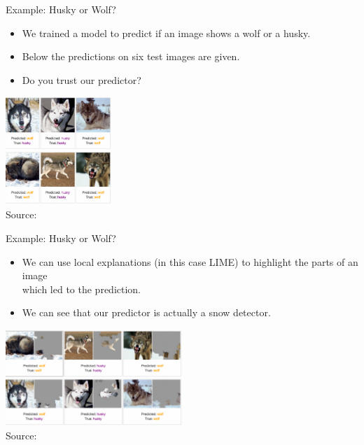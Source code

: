 \documentclass[aspectratio=169]{../latex_main/tntbeamer}  %
\begin{document}
\begin{frame}{Example: Husky or Wolf?}
	\begin{itemize}
		\item We trained a model to predict if an image shows a wolf or a husky. 
		\item Below the predictions on six test images are given. 
		\item Do you trust our predictor? 
	\end{itemize}
	\begin{center}
		\includegraphics[width=0.3\textwidth]{figure/lime-wolfhusky.png}\\
		\includegraphics[width=0.3\textwidth]{figure/lime-wolfhusky2.png}\\
		{Source: }
	\end{center}

\end{frame}
\begin{frame}{Example: Husky or Wolf?}
	
	\begin{itemize}
		\item We can use local explanations (in this case LIME) to highlight the parts of an image\\ which led to the prediction.
		\item We can see that our predictor is actually a snow detector. 
	\end{itemize}
	\begin{center}
		\includegraphics[width=0.5\textwidth]{figure/lime-wolfhusky3.png}\\
		{ Source: }
	\end{center}
\end{frame}
\end{document}
